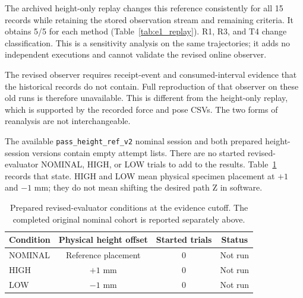 The archived height-only replay changes this reference consistently for all 15 records while retaining the stored observation stream and remaining criteria. It obtains 5/5 for each method (Table~\ref{tab:e1_replay}). R1, R3, and T4 change classification. This is a sensitivity analysis on the same trajectories; it adds no independent executions and cannot validate the revised online observer.

\begin{table}[tbp]\centering\small
\caption[E1 height-only offline replay]{Height-only offline replay of the same E1 records using the first successful loaded-pass height reference. These values are secondary reanalysis, not results from a newly executed evaluator or height-variation experiment.}
\label{tab:e1_replay}

\end{table}


The revised observer requires receipt-event and consumed-interval evidence that the historical records do not contain. Full reproduction of that observer on these old runs is therefore unavailable. This is different from the height-only replay, which is supported by the recorded force and pose CSVs. The two forms of reanalysis are not interchangeable.

The available \texttt{pass\_height\_ref\_v2} nominal session and both prepared height-session versions contain empty attempt lists. There are no started revised-evaluator NOMINAL, HIGH, or LOW trials to add to the results. Table~\ref{tab:height_status} records that state. HIGH and LOW mean physical specimen placement at \(+1\) and \(-1\) mm; they do not mean shifting the desired path Z in software.

\begin{table}[tbp]\centering\small
\caption[Prepared height-condition status]{Prepared revised-evaluator conditions at the evidence cutoff. The completed original nominal cohort is reported separately above.}
\label{tab:height_status}
\begin{tabular}{lccc}
\toprule Condition & Physical height offset & Started trials & Status \\ \midrule
NOMINAL & Reference placement & 0 & Not run \\
HIGH & \(+1\) mm & 0 & Not run \\
LOW & \(-1\) mm & 0 & Not run \\
\bottomrule
\end{tabular}
\end{table}

